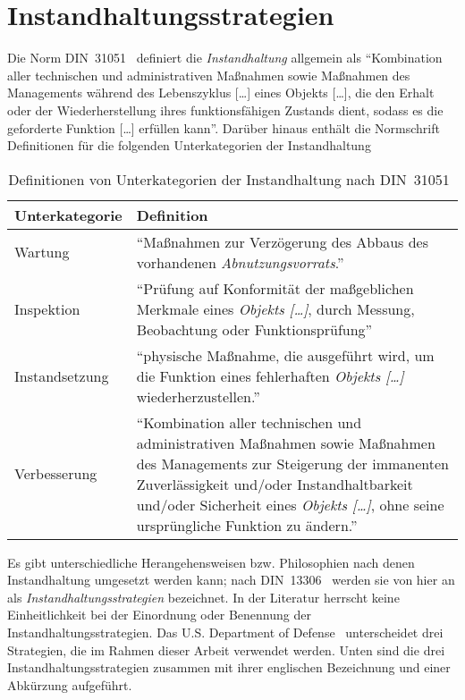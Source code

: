 \chapter{Instandhaltungsstrategien}
\label{ch:instandhaltungsstrategien}
Die Norm DIN~31051~\cite{DIN.2019} definiert die \textit{Instandhaltung} allgemein als \enquote{Kombination aller technischen und administrativen Maßnahmen sowie Maßnahmen des Managements während des Lebenszyklus [\dots] eines Objekts [\dots], die den Erhalt oder der Wiederherstellung ihres funktionsfähigen Zustands dient, sodass es die geforderte Funktion [\dots] erfüllen kann}. Darüber hinaus enthält die Normschrift Definitionen für die folgenden Unterkategorien der Instandhaltung

\begin{table}[ht]
	\raggedright
	\begin{tabularx}{\textwidth}{ | l | X |}
		\hline
        \rowcolor{lightgray}
        Unterkategorie & Definition\\
        \hline
        Wartung & \enquote{Maßnahmen zur Verzögerung des Abbaus des vorhandenen \textit{Abnutzungsvorrats}.}\\
        \hline
        Inspektion & \enquote{Prüfung auf Konformität der maßgeblichen Merkmale eines \textit{Objekts […]}, durch Messung, Beobachtung oder Funktionsprüfung}\\
        \hline
        Instandsetzung & \enquote{physische Maßnahme, die ausgeführt wird, um die Funktion eines fehlerhaften \textit{Objekts […] }wiederherzustellen.}\\
        \hline
        Verbesserung & \enquote{Kombination aller technischen und administrativen Maßnahmen sowie Maßnahmen des Managements zur Steigerung der immanenten Zuverlässigkeit und/oder Instandhaltbarkeit und/oder Sicherheit eines \textit{Objekts […]}, ohne seine ursprüngliche Funktion zu ändern.}\\
        \hline
	\end{tabularx}
	\caption{Definitionen von Unterkategorien der Instandhaltung nach DIN~{31051}~\cite{DIN.2019}}%
	\label{tab:definition_unterkategorien_instandhaltung}	%
\end{table}

Es gibt unterschiedliche Herangehensweisen bzw. Philosophien nach denen Instandhaltung umgesetzt werden kann; nach DIN~13306~\cite{DIN.2018} werden sie von hier an als \textit{Instandhaltungsstrategien} bezeichnet. In der Literatur herrscht keine Einheitlichkeit bei der Einordnung oder Benennung der Instandhaltungsstrategien. Das U.S. Department of Defense~\cite[S.~16]{U.S.DepartmentofDefense.2008} unterscheidet drei Strategien, die im Rahmen dieser Arbeit verwendet werden. Unten sind die drei Instandhaltungsstrategien zusammen mit ihrer englischen Bezeichnung und einer Abkürzung aufgeführt.

